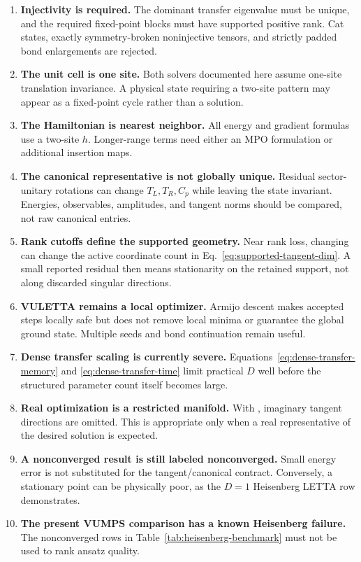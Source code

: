 \documentclass[11pt]{article}
\newcommand{\code}[1]{\texttt{\detokenize{#1}}}
\begin{document}
\begin{enumerate}
  \item \textbf{Injectivity is required.}
        The dominant transfer eigenvalue must be unique, and the required
        fixed-point blocks must have supported positive rank.  Cat states,
        exactly symmetry-broken noninjective tensors, and strictly padded
        bond enlargements are rejected.
  \item \textbf{The unit cell is one site.}
        Both solvers documented here assume one-site translation invariance.
        A physical state requiring a two-site pattern may appear as a
        fixed-point cycle rather than a solution.
  \item \textbf{The Hamiltonian is nearest neighbor.}
        All energy and gradient formulas use a two-site $h$.  Longer-range
        terms need either an MPO formulation or additional insertion maps.
  \item \textbf{The canonical representative is not globally unique.}
        Residual sector-unitary rotations can change $T_L,T_R,C_p$ while
        leaving the state invariant.  Energies, observables, amplitudes, and
        tangent norms should be compared, not raw canonical entries.
  \item \textbf{Rank cutoffs define the supported geometry.}
        Near rank loss, changing
        \code{canonical_}\allowbreak\code{rcond} can change the active
        coordinate count in Eq.~\eqref{eq:supported-tangent-dim}.
        A small reported residual then means stationarity on the retained
        support, not along discarded singular directions.
  \item \textbf{VULETTA remains a local optimizer.}
        Armijo descent makes accepted steps locally safe but does not remove
        local minima or guarantee the global ground state.  Multiple seeds
        and bond continuation remain useful.
  \item \textbf{Dense transfer scaling is currently severe.}
        Equations~\eqref{eq:dense-transfer-memory} and
        \eqref{eq:dense-transfer-time} limit practical $D$ well before the
        structured parameter count itself becomes large.
  \item \textbf{Real optimization is a restricted manifold.}
        With \code{real=True}, imaginary tangent directions are omitted.
        This is appropriate only when a real representative of the desired
        solution is expected.
  \item \textbf{A nonconverged result is still labeled nonconverged.}
        Small energy error is not substituted for the tangent/canonical
        contract.  Conversely, a stationary point can be physically poor, as
        the $D=1$ Heisenberg LETTA row demonstrates.
  \item \textbf{The present VUMPS comparison has a known Heisenberg failure.}
        The nonconverged rows in Table~\ref{tab:heisenberg-benchmark} must not
        be used to rank ansatz quality.
\end{enumerate}
\end{document}
